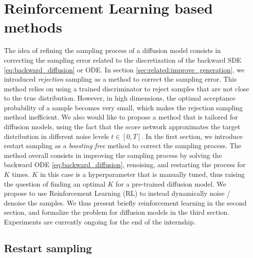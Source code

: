 %
\chapter{Reinforcement Learning based methods}\label{sec:rl}
The idea of refining the sampling process of a diffusion model consists in correcting the sampling error related to the discretization of the backward SDE \ref{eq:backward_diffusion} or ODE. 
In section \ref*{sec:related:improve_generation}, we introduced \textit{rejection} sampling as a method to correct the sampling error. This method relies on using a trained discriminator to reject samples that are not close to the true distribution.
However, in high dimensions, the optimal acceptance probability of a sample becomes very small, which makes the rejection sampling method inefficient. We also would like to propose a method that is tailored for diffusion models, using the fact that the score network approximates the target distribution in different noise levels $t \in [0, T]$.
In the first section, we introduce restart sampling \citep{xu_restart_2023} as a \textit{boosting free} method to correct the sampling process. The method overall consists in improving the sampling process by solving the backward ODE \ref{eq:backward_diffusion}, renoising, and restarting the process for $K$ times. $K$ in this case is a hyperparameter that is manually tuned, thus raising the question of finding an optimal $K$ for a pre-trained diffusion model.
We propose to use Reinforcement Learning (RL) to instead dynamically noise / denoise the samples. We thus present briefly reinforcement learning in the second section, and formalize the problem for diffusion models in the third section. Experiments are currently ongoing for the end of the internship.




\section{Restart sampling}\label{sec:rl:sec1}
